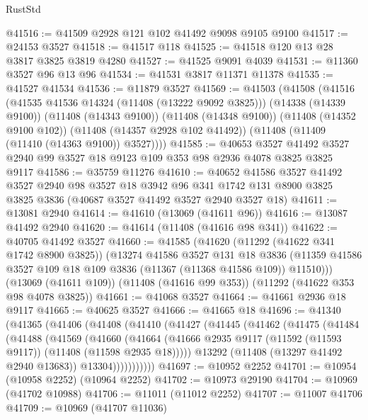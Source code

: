 \begin{lexlean}{RustStd}
\begin{coremodule}
@41516 := @41509 @2928 @121 @102 @41492 @9098 @9105 @9100
@41517 := @24153 @3527
@41518 := @41517 @118
@41525 := @41518 @120 @13 @28 @3817 @3825 @3819 @4280
@41527 := @41525 @9091 @4039
@41531 := @11360 @3527 @96 @13 @96
@41534 := @41531 @3817 @11371 @11378
@41535 := @41527 @41534
@41536 := @11879 @3527
@41569 := @41503
    (@41508
      (@41516
        (@41535 @41536 @14324 (@11408 (@13222 @9092 @3825)))
        (@14338 (@14339 @9100))
        (@11408 (@14343 @9100))
        (@11408 (@14348 @9100))
        (@11408 (@14352 @9100 @102))
        (@11408 (@14357 @2928 @102 @41492))
        (@11408 (@11409 (@11410 (@14363 @9100)) @3527))))
@41585 := @40653
    @3527
    @41492
    @3527
    @2940
    @99
    @3527
    @18
    @9123
    @109
    @353
    @98
    @2936
    @4078
    @3825
    @3825
    @9117
@41586 := @35759 @11276
@41610 := @40652
    @41586
    @3527
    @41492
    @3527
    @2940
    @98
    @3527
    @18
    @3942
    @96
    @341
    @1742
    @131
    @8900
    @3825
    @3825
    @3836
    (@40687 @3527 @41492 @3527 @2940 @3527 @18)
@41611 := @13081 @2940
@41614 := @41610 (@13069 (@41611 @96))
@41616 := @13087 @41492 @2940
@41620 := @41614 (@11408 (@41616 @98 @341))
@41622 := @40705 @41492 @3527
@41660 := @41585
    (@41620
      (@11292 (@41622 @341 @1742 @8900 @3825))
      (@13274
        @41586
        @3527
        @131
        @18
        @3836
        (@11359 @41586 @3527 @109 @18 @109 @3836 (@11367 (@11368 @41586 @109)) @11510)))
    (@13069 (@41611 @109))
    (@11408 (@41616 @99 @353))
    (@11292 (@41622 @353 @98 @4078 @3825))
@41661 := @41068 @3527
@41664 := @41661 @2936 @18 @9117
@41665 := @40625 @3527
@41666 := @41665 @18
@41696 := @41340
    (@41365
      (@41406
        (@41408
          (@41410
            (@41427
              (@41445
                (@41462
                  (@41475
                    (@41484
                      (@41488
                        (@41569
                          (@41660
                            (@41664
                              (@41666
                                @2935
                                @9117
                                (@11592 (@11593 @9117))
                                (@11408 (@11598 @2935 @18)))))
                          @13292
                          (@11408 (@13297 @41492 @2940 @13683))
                          @13304)))))))))))
@41697 := @10952 @2252
@41701 := @10954 (@10958 @2252) (@10964 @2252)
@41702 := @10973 @29190
@41704 := @10969 (@41702 @10988)
@41706 := @11011 (@11012 @2252)
@41707 := @11007 @41706
@41709 := @10969 (@41707 @11036)

\end{coremodule}
\end{lexlean}
